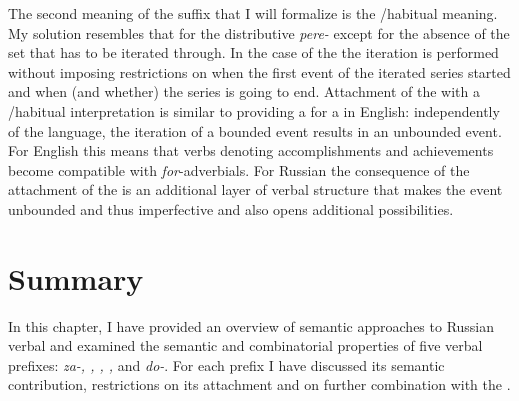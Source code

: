 
The second meaning of the  suffix that I will formalize is the /habitual meaning. My solution resembles that for the distributive \textit{pere-} except for the absence of the set that has to be iterated through. In the case of the  the iteration is performed without imposing restrictions on when the first event of the iterated series started and when (and whether) the series is going to end. Attachment of the  with a /habitual interpretation is similar to providing a   for a  in English: independently of the language, the iteration of a bounded event results in an unbounded event. For English this means that verbs denoting accomplishments and achievements become compatible with \textit{for}-adverbials. For Russian the consequence of the attachment of the  is an additional layer of verbal structure that makes the event unbounded and thus imperfective and also opens additional  possibilities. 


\section{Summary}
In this chapter, I have provided an overview of semantic approaches to Russian verbal  and examined the semantic and combinatorial properties of five verbal prefixes: \textit{za-, , , ,} and \textit{do-}. For each prefix I have discussed its semantic contribution, restrictions on its attachment and on further combination with the . 


